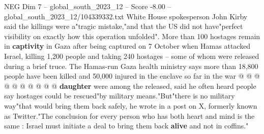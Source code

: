 \begin{textsample}{NEG Dim 7 – global\_south\_2023\_12 – Score -8.00 – global\_south\_2023\_12/104339332.txt}
White House spokesperson John Kirby said the killings were a"tragic mistake,"and that the US did not have"perfect visibility on exactly how this operation unfolded".
More than 100 hostages remain in \textbf{captivity} in Gaza after being captured on 7 October when Hamas attacked Israel, killing 1,200 people and taking 240 hostages -- some of whom were released during a brief truce.
The Hamas-run Gaza health ministry says more than 18,800 people have been killed and 50,000 injured in the enclave so far in the war @ @ @ @ @ @ @ @ @ @ \textbf{daughter} were among the released, said he often heard people say hostages could be rescued"by military means."But"there is no military way"that would bring them back safely, he wrote in a post on X, formerly known as Twitter."The conclusion for every person who has both heart and mind is the same : Israel must initiate a deal to bring them back \textbf{alive} and not in coffins."

\end{textsample}
